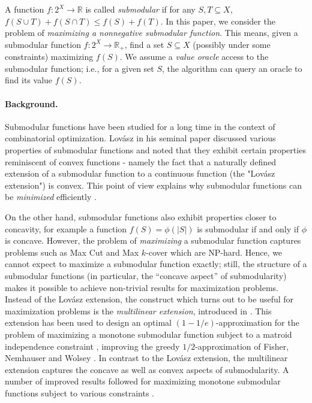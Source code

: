 \documentclass{article}[11pt]
\def\RR{{\mathbb R}}
\begin{document}
A function $f: 2^X \rightarrow \RR$ is called {\em submodular} if for any $S, T \subseteq X$,
$ f(S \cup T) + f(S \cap T) \leq f(S) + f(T).$ In this paper,
we consider the problem of {\em maximizing a nonnegative submodular function}.
This means, given a submodular function $f: 2^X \rightarrow \RR_+$, find
a set $S \subseteq X$ (possibly under some constraints) maximizing $f(S)$.
We assume a {\em value oracle} access to the submodular function; i.e., for a given set $S$,
the algorithm can query an oracle to find its value $f(S)$.

\paragraph{Background.}
Submodular functions have been studied for a long time in the context of combinatorial
optimization.
Lov\'asz in his seminal paper \cite{Lovasz83} discussed various properties
of submodular functions and noted that they exhibit certain properties
reminiscent of convex functions - namely the fact that a naturally defined extension
of a submodular function to a continuous function (the "Lov\'asz extension") is convex. 
This point of view explains why submodular functions can be {\em minimized}
efficiently \cite{GLS81,FFI00,Schrijver00}.

On the other hand, submodular functions also exhibit properties closer to concavity,
for example a function $f(S) = \phi(|S|)$ is submodular if and only if $\phi$ is concave.
However, the problem of {\em maximizing} a submodular function captures
problems such as Max Cut \cite{GW95} and Max $k$-cover \cite{Feige98} which are NP-hard.
Hence, we cannot expect to maximize a submodular function exactly;
still, the structure of a submodular functions (in particular, the ``concave aspect''
of submodularity) makes it possible to achieve non-trivial results for maximization problems.
Instead of the Lov\'asz extension, the construct which turns out to be useful for maximization
problems is the {\em multilinear extension}, introduced in \cite{CCPV07}. 
This extension has been used to design an optimal $(1-1/e)$-approximation for the
problem of maximizing a monotone submodular function subject to a matroid independence
constraint \cite{Vondrak08,CCPV09}, improving the greedy $1/2$-approximation of
Fisher, Nemhauser and Wolsey \cite{NWF78II}.
In contrast to the Lov\'asz extension,
the multilinear extension captures the concave as well as convex aspects of submodularity.
A number of improved results followed for maximizing monotone submodular functions subject
to various constraints \cite{KST09,LMNS09,LSV09,CVZ10}.
\end{document}
